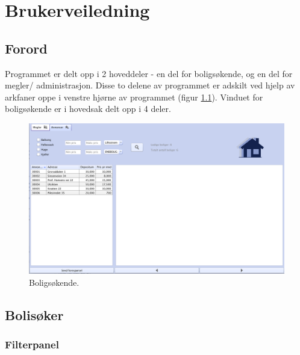 \chapter{Brukerveiledning}

%
%




\section{Forord}
Programmet er delt opp i 2 hoveddeler - en del for boligsøkende, og en del for megler/
administrasjon. Disse to delene av programmet er adskilt ved hjelp av arkfaner oppe i venstre
hjørne av programmet (figur \ref{fig:bv:1}).
Vinduet for boligsøkende er i hovedsak delt opp i 4 deler.




\begin{figure}[h!]
 \includegraphics[width=\textwidth,height=\textheight,keepaspectratio]{./img/brukerveiledning/1.png}
 \caption{Boligsøkende.}
 \label{fig:bv:1}
\end{figure}





\section{Bolisøker}



\subsection{Filterpanel}

